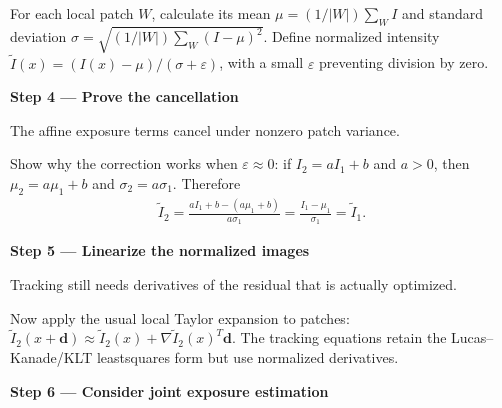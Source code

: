 \documentclass[letterpaper,11pt,english,openany,oneside]{jupyterBook}
\begin{document}
\sphinxAtStartPar
For each local patch {\color{QuizMathBlue} \(W\)}, calculate its mean {\color{QuizMathBlue} \(\mu=(1/|W|)\sum_W I\)} and standard deviation {\color{QuizMathBlue} \(\sigma=\sqrt{(1/|W|)\sum_W(I-\mu)^2}\)}. Define normalized intensity {\color{QuizMathBlue} \(\boxed{\widetilde I(x)=(I(x)-\mu)/(\sigma+\varepsilon)}\)}, with a small {\color{QuizMathBlue} \(\varepsilon\)} preventing division by zero.

\par

\par\medskip{}
{\color{QuizStepRed}\bfseries Step 4 — Prove the cancellation}\par\smallskip

\sphinxAtStartPar
{} The affine exposure terms cancel under nonzero patch variance.

\sphinxAtStartPar
Show why the correction works when {\color{QuizMathBlue} \(\varepsilon\approx0\)}: if {\color{QuizMathBlue} \(I_2=aI_1+b\)} and {\color{QuizMathBlue} \(a>0\)}, then {\color{QuizMathBlue} \(\mu_2=a\mu_1+b\)} and {\color{QuizMathBlue} \(\sigma_2=a\sigma_1\)}. Therefore
{\color{QuizMathBlue} \begin{equation*}
\begin{split}
\widetilde I_2=\frac{aI_1+b-(a\mu_1+b)}{a\sigma_1}=\frac{I_1-\mu_1}{\sigma_1}=\widetilde I_1.
\end{split}
\end{equation*}}
\par

\par\medskip{}
{\color{QuizStepRed}\bfseries Step 5 — Linearize the normalized images}\par\smallskip

\sphinxAtStartPar
{} Tracking still needs derivatives of the residual that is actually optimized.

\sphinxAtStartPar
Now apply the usual local Taylor expansion to  patches: {\color{QuizMathBlue} \(\widetilde I_2(x+\mathbf d)\approx\widetilde I_2(x)+\nabla\widetilde I_2(x)^T\mathbf d\)}. The tracking equations retain the Lucas–Kanade/KLT least\sphinxhyphen{}squares form but use normalized derivatives.

\par

\par\medskip{}
{\color{QuizStepRed}\bfseries Step 6 — Consider joint exposure estimation}\par\smallskip
\end{document}
